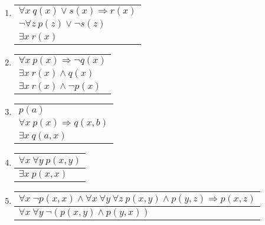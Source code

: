 {\begin{enumerate}

	\item \enter
\begin{flushleft}
\begin{tabular}{l}
$\forall x \ q(x) \vee s(x) \Rightarrow r(x) $ \\
$\neg \forall z \ p(z) \vee \neg s(z)$ \\
\hline
$\exists x \ r(x)$
\end{tabular}
\end{flushleft}

	\item \enter
\begin{flushleft}
\begin{tabular}{l}
$\forall x \ p(x) \Rightarrow \neg q(x)$ \\
$\exists x \ r(x) \land q(x)$ \\
\hline
$\exists x \ r(x) \land \neg p(x)$
\end{tabular}
\end{flushleft}

	\item \enter
\begin{flushleft}
\begin{tabular}{l}
$p(a)$ \\
$\forall x \ p(x) \Rightarrow q(x, b)$ \\
\hline
$\exists x \ q(a, x)$
\end{tabular}
\end{flushleft}

	\item \enter
\begin{flushleft}
\begin{tabular}{l}
$\forall x \ \forall y \ p(x, y)$ \\
\hline
$\exists x \ p(x, x)$
\end{tabular}
\end{flushleft}

	\item \enter
\begin{flushleft}
\begin{tabular}{l}
$\forall x \ \neg p(x, x) \land \forall x \ \forall y \ \forall z \ p(x, y) \land p(y, z) \Rightarrow p(x, z)$ \\
\hline
$\forall x \ \forall y \ \neg (p(x, y) \land p(y, x))$
\end{tabular}
\end{flushleft}

\end{enumerate}


}
